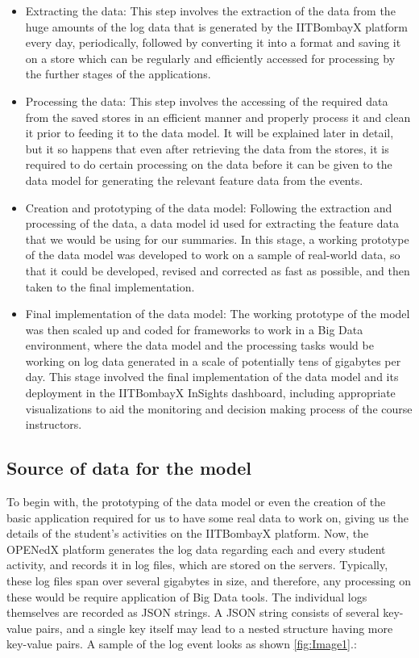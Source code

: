 \documentclass[16pt]{report}
\begin{document}
\begin{itemize}
\item Extracting the data: This step involves the extraction of the data from the huge amounts of the log data that is generated by the IITBombayX platform every day, periodically, followed by converting it into a format and saving it on a store which can be regularly and efficiently accessed for processing by the further stages of the applications.

\item Processing the data: This step involves the accessing of the required data from the saved stores in an efficient manner and properly process it and clean it prior to feeding it to the data model. It will be explained later in detail, but it so happens that even after retrieving the data from the stores, it is required to do certain processing on the data before it can be given to the data model for generating the relevant feature data from the events.

\item Creation and prototyping of the data model: Following the extraction and processing of the data, a data model id used for extracting the feature data that we would be using for our summaries. In this stage, a working prototype of the data model was developed to work on a sample of real-world data, so that it could be developed, revised and corrected as fast as possible, and then taken to the final implementation.

\item Final implementation of the data model: The working prototype of the model was then scaled up and coded for frameworks to work in a Big Data environment, where the data model and the processing tasks would be working on log data generated in a scale of potentially tens of gigabytes per day. This stage involved the final implementation of the data model and its deployment in the IITBombayX InSights dashboard, including appropriate visualizations to aid the monitoring and decision making process of the course instructors.

\end{itemize}

\subsection{Source of data for the model}

To begin with, the prototyping of the data model or even the creation of the basic application required for us to have some real data to work on, giving us the details of the student's activities on the IITBombayX platform. Now, the OPENedX platform generates the log data regarding each and every student activity, and records it in log files, which are stored on the servers. Typically, these log files span over several gigabytes in size, and therefore, any processing on these would be require application of Big Data tools. The individual logs themselves are recorded as JSON strings. A JSON string consists of several key-value pairs, and a single key itself may lead to a nested structure having more key-value pairs. A sample of the log event looks as shown \ref{fig:Image1}.:
\end{document}
